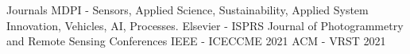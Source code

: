 

\begin{cvskills}

  
  
  \cvskill
    {Journals} %
    {MDPI - Sensors, Applied Science, Sustainability, Applied System Innovation, Vehicles, AI, Processes.}   %
  \cvskill
    {} %
    {Elsevier - ISPRS Journal of Photogrammetry and Remote Sensing} %
   \cvskill
    {Conferences} %
    {IEEE  - ICECCME 2021} %
   \cvskill
    {} %
    {ACM  - VRST 2021} %
    
\end{cvskills}